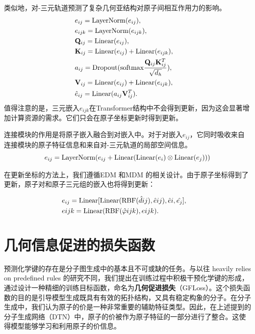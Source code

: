 类似地，对-三元轨道预测了复杂几何亚结构对原子间相互作用力的影响。
\begin{eqnarray}
    &e_{ij} = {\rm LayerNorm}(e_{ij}),&\\
    &e_{ijk} = {\rm LayerNorm}(e_{ijk}),&\\
    &\mathbf{Q}_{ij} = {\rm Linear}(e_{ij}),& \\ 
    &\mathbf{K}_{ij} = {\rm Linear}(e_{ij}) + {\rm Linear}(e_{ijk}),& \\
    &a_{ij}= {\rm Dropout}({\rm softmax} \frac{\mathbf{Q}_{ij} \mathbf{K}_{ij}^T}{\sqrt{d_h}}), & \\
    &\mathbf{V}_{ij} = {\rm Linear}(e_{ij}) + {\rm Linear}(e_{ijk}),& \\
    &\hat{e}_{ij} = {\rm Linear}(a_{ij} \mathbf{V}_{ij}^T).&
\end{eqnarray}
值得注意的是，三元嵌入$e_{ijk}$在Transformer结构中不会得到更新，因为这会显著增加计算资源的需求。它们只会在原子坐标更新时得到更新。

连接模块的作用是将原子嵌入融合到对嵌入中。对于对嵌入$e_{ij}$，它同时吸收来自连接模块的原子特征信息和来自对-三元轨道的局部空间信息。
\begin{equation}
    e_{ij} = {\rm LayerNorm}(e_{ij} + {\rm Linear}({\rm Linear}(e_i) \otimes {\rm Linear}(e_j)))
\end{equation}

在更新坐标的方法上，我们遵循EDM \cite{edm_hoogeboom_22}和MDM \cite{mdm_huang_23}的相关设计。由于原子坐标得到了更新，原子对和原子三元组的嵌入也将得到更新：

\begin{eqnarray}
  &e_{ij} = {\rm Linear}[{\rm Linear}({\rm RBF}(\hat{d}{ij}), \hat{e}{ij}), \hat{e}i, \hat{e_j}],& \\
  &e{ijk} = {\rm Linear}({\rm RBF}(\hat{\varphi}{ijk}), e{ijk}). &
\end{eqnarray}

\section{几何信息促进的损失函数}
预测化学键的存在是分子图生成中的基本且不可或缺的任务。与以往 heavily relies on predefined rules 的研究不同，我们提出在训练过程中积极干预化学键的形成，通过设计一种精细的训练目标函数，命名为\textbf{几何促进损失}（GFLoss）。这个损失函数的目的是引导模型生成既具有有效的拓扑结构，又具有稳定构象的分子。在分子生成中，我们认为原子的价是一种非常重要的辅助特征类型。因此，在上述提到的分子生成网络（DTN）中，原子的价被作为原子特征的一部分进行了整合。这使得模型能够学习和利用原子的价信息。

